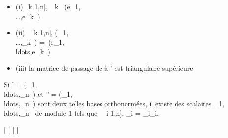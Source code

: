 \documentclass[]{article}
\begin{document}
\begin{itemize}
\itemsep1pt\parskip0pt
\item
  (i) \forall~k \in {[}1,n{]}, \epsilon_k~
  \in\mathrmVect(e_1,\\\ldots,e_k~)
\item
  (ii) \forall~~k \in {[}1,n{]},
  \mathrmVect(\epsilon_1,\\\ldots,\epsilon_k~)
  =\
  \mathrmVect(e_1,\\ldots,e_k~)
\item
  (iii) la matrice de passage de  à ' est triangulaire supérieure
\end{itemize}

Si ' =
(\epsilon_1,\\ldots,\epsilon_n~)
et \mathcal{E}'' =
(\eta_1,\\ldots,\eta_n~)
sont deux telles bases orthonormées, il existe des scalaires
\lambda_1,\\ldots,\lambda_n~
de module 1 tels que \forall~~i \in {[}1,n{]},
\eta_i = \lambda_i\epsilon_i.

{[}
{[}
{[}
{[}
\end{document}
